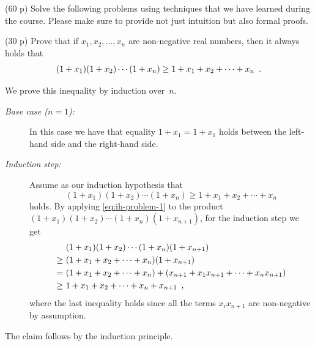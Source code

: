 \documentclass{jn-pset}
\begin{document}
\begin{problem}
  (60 p)
  Solve the following problems using
  techniques that we have learned during the course.
  Please make sure to provide not just intuition but also formal proofs.

  \begin{subproblem}%
    {(30 p)}
    {\ignorespaces}
    Prove that if
    $x_1, x_2, \ldots, x_n$
    are non-negative real numbers, then
    it always holds that
    \begin{equation*}
      (1 + x_1) (1 + x_2) \cdots  (1 + x_n)
      \geq
      1 + x_1 + x_2 + \cdots + x_n
      \enspace .
    \end{equation*}
  \end{subproblem}

\begin{solution}
We prove this inequality by induction over~$n$.

\begin{description}
\item[\emph{Base case ($n=1$):}]
  In this case we have that equality
  $
  1 + x_1
  =
  1 + x_1
  $
  holds between the left-hand side and the right-hand side.
  
\item[\emph{Induction step:}]
  Assume as our induction hypothesis that
  \begin{equation}
    \label{eq:ih-problem-1}
    (1 + x_1) (1 + x_2) \cdots  (1 + x_n)
    \geq
    1 + x_1 + x_2 + \cdots + x_n
  \end{equation}
  holds.
  By
  applying
  \eqref{eq:ih-problem-1}
  to the product
  $
  (1 + x_1) (1 + x_2) \cdots  (1 + x_n) (1 + x_{n+1})
  $,
  for the induction step we get
  \begin{subequations}
  \begin{align}
    \label{eq:istep-problem-1}
    &(1 + x_1) (1 + x_2) \cdots  (1 + x_n)  (1 + x_{n+1})
    \\
    \geq\ 
    &(1 + x_1 + x_2 + \cdots + x_n)  (1 + x_{n+1})
    \\
    =\ 
    &(1 + x_1 + x_2 + \cdots + x_n)
      +
      (x_{n+1} +  x_1 x_{n+1} + \cdots + x_n x_{n+1} )  
    \\
    \geq\ 
    &1 + x_1 + x_2 + \cdots + x_n
      +
      x_{n+1}
      \eqcomma
  \end{align}
  \end{subequations}  
  where the last inequality holds since all the terms
  $x_i x_{n+1}$
  are non-negative by assumption.
\end{description}
The claim follows by the induction principle.  
\end{solution}



\end{problem}
\end{document}
